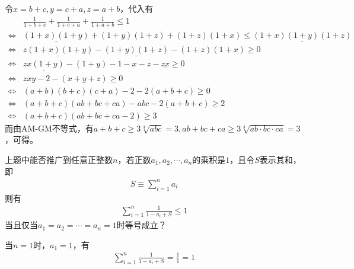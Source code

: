 令$x=b+c, y=c+a, z=a+b$，代入有
\begin{align*}
  & \frac1{1+b+c}+\frac1{1+c+a}+\frac1{1+a+b}\le 1\\
  \iff & \underline{(1+x)(1+y)} + (1+y)(1+z) + (1+z)(1+x) \le \underline{(1+x)(1+y)(1+z)}\\
  \iff & \underline{z(1+x)(1+y)} - \underline{(1+y)(1+z)} - (1+z)(1+x) \ge 0\\
  \iff & \underline{zx(1+y)} - (1+y) - 1-x-z-\underline{zx}\ge 0\\
  \iff & zxy - 2 - (x+y+z)\ge 0\\
  \iff & (a+b)(b+c)(c+a) - 2 - 2(a+b+c)\ge 0\\
  \iff & (a+b+c)(ab+bc+ca) - abc -2(a+b+c)\ge 2\\
  \iff & (a+b+c)(ab+bc+ca-2)\ge 3
\end{align*}
而由AM-GM不等式，有$a+b+c\ge 3\sqrt[3]{abc}=3, ab+bc+ca\ge 3\sqrt[3]{ab\cdot bc\cdot ca}=3$，可得。


\begin{question}
  上题中能否推广到任意正整数$n$，若正数$a_1,a_2,\cdots,a_n$的乘积是$1$，且令$S$表示其和，即
  \begin{align*}
    S\equiv\sum_{i=1}^n a_i
  \end{align*}
  则有
  \begin{align*}
    \sum_{i=1}^n \frac{1}{1 - a_i + S}\le 1
  \end{align*}
  当且仅当$a_1=a_2=\cdots=a_n=1$时等号成立？
\end{question}

当$n=1$时，$a_1=1$，有
\begin{align*}
  \sum_{i=1}^n \frac{1}{1 - a_i + S} = \frac{1}{1} = 1
\end{align*}

